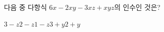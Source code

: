다음 중 다항식 $6x-2xy-3xz+xyz$의 인수인 것은?
\begin{choices32}{$3-z$}{$2-z$}{$1-z$}{$3+y$}{$2+y$}\end{choices32}
